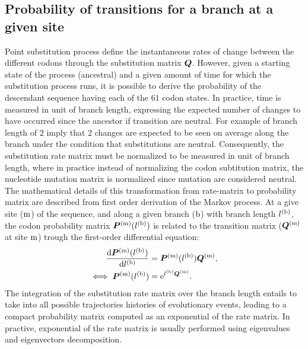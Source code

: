 \subsection{Probability of {transitions} for a branch at a given site}
Point \gls{substitution} process define the instantaneous rates of change between the different \glspl{codon} through the \gls{substitution} matrix $\bm{Q}$.
However, given a starting state of the process (ancestral) and a given amount of time for which the \gls{substitution} process runs, it is possible to derive the probability of the descendant sequence having each of the $61$ \gls{codon} states.
In practice, time is measured in unit of branch length, expressing the expected number of changes to have occurred since the ancestor if {transition} are \gls{neutral}.
For example of branch length of $2$ imply that $2$ changes are expected to be seen on average along the branch under the condition that \glspl{substitution} are \gls{neutral}.
Consequently, the \gls{substitution} rate matrix must be normalized to be measured in unit of branch length, where in practice instead of normalizing the \gls{codon} subtitution matrix, the nucleotide mutation matrix is normalized since mutation are considered \gls{neutral}.
The mathematical details of this transformation from rate-matrix to probability matrix are described from first order derivation of the Markov process.
At a give site ($\text{m}$) of the sequence, and along a given branch ($\text{b}$) with branch length $l^{(\text{b})}$, the \gls{codon} probability matrix $\bm{P}^{(\text{m})}(l^{(\text{b})})$ is related to the {transition} matrix ($\bm{Q}^{(\text{m})}$ at site $\text{m}$) trough the first-order differential equation:
\begin{align}
	\dfrac{\mathrm{d} \bm{P}^{(\text{m})}(l^{(\text{b})})}{\mathrm{d} l^{(\text{b})}}	& = \bm{P}^{(\text{m})}(l^{(\text{b})}) \bm{Q}^{(\text{m})}, \\
	\iff \bm{P}^{(\text{m})}(l^{(\text{b})}) & = \mathrm{e}^{l^{(\text{b})} \bm{Q}^{(\text{m})}}.
\end{align}
The integration of the \gls{substitution} rate matrix over the branch length entails to take into all possible trajectories histories of evolutionary events, leading to a compact probability matrix computed as an exponential of the rate matrix.
In practive, exponential of the rate matrix is usually performed using eigenvalues and eigenvectors decomposition.

